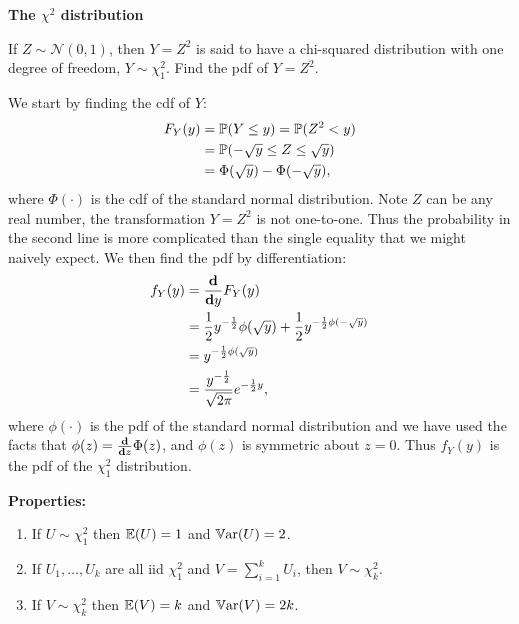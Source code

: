 \documentclass[10pt, a4paper]{article}
\begin{document}
\textbf{The $\chi ^ 2$ distribution}
\begin{example}
    If $Z \sim \mathcal{N}(0, 1)$,
    then $Y = Z ^ 2$ is said to have a chi-squared distribution with one degree of freedom,
    $Y \sim \chi_1 ^ 2$.
    Find the pdf of $Y = Z ^ 2$.

    \begin{solution}
        We start by finding the cdf of $Y$:
        \begin{align*}
            F_Y(y) &= \P(Y \leq y) = \P(Z ^ 2< y) \\
            &= \P(-\sqrt{y} \leq Z \leq \sqrt{y}) \\
            &= \Phi(\sqrt{y}) - \Phi(-\sqrt{y}),
        \end{align*}
        where $\Phi(\cdot)$ is the cdf of the standard normal distribution.
        Note $Z$ can be any real number,
        the transformation $Y = Z ^ 2$ is not one-to-one.
        Thus the probability in the second line is more complicated than the single equality that we might naively expect.
        We then find the pdf by differentiation:
        \begin{align*}
            f_Y(y) &= \frac{\mbf{d}}{\mbf{d}y}F_Y(y) \\
            &= \frac{1}{2}y ^ {-\frac{1}{2}}\phi(\sqrt{y}) + \frac{1}{2}y ^ {-\frac{1}{2}\phi(-\sqrt{y})} \\
            &= y ^ {-\frac{1}{2}\phi(\sqrt{y})} \\
            &= \frac{y ^ {-\frac{1}{2}}}{\sqrt{2\pi}}e ^ {-\frac{1}{2}y},
        \end{align*}
        where $\phi(\cdot)$ is the pdf of the standard normal distribution and we have used the facts that $\phi(z) = \frac{\mbf{d}}{\mbf{d}z}\Phi(z)$,
        and $\phi(z)$ is symmetric about $z = 0$.
        Thus $f_Y(y)$ is the pdf of the $\chi_1 ^ 2$ distribution.
    \end{solution}
\end{example}

\textbf{Properties:}

\begin{enumerate}[label = \arabic*.]
    \item If $U \sim \chi_1 ^ 2$ then $\E(U) = 1$ and $\Var(U) = 2$.
    
    \item If $U_1, \dotsc, U_k$ are all iid $\chi_1 ^ 2$ and $V = \sum_{i = 1}^{k}U_i$,
    then $V \sim \chi_k ^ 2$.

    \item If $V \sim \chi_k ^ 2$ then $\E(V) = k$ and $\Var(V) = 2k$.
\end{enumerate}
\end{document}
